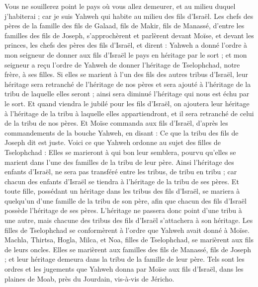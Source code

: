 \begin{multicols}{2}
Vous ne souillerez point le pays où vous allez demeurer, et au milieu duquel j'habiterai ; car je suis Yahweh qui habite au milieu des fils d'Israël.
\VerseOne{}Les chefs des pères de la famille des fils de Galaad, fils de Makir, fils de Manassé, d'entre les familles des fils de Joseph, s'approchèrent et parlèrent devant Moïse, et devant les princes, les chefs des pères des fils d'Israël,
et dirent : Yahweh a donné l’ordre à mon seigneur de donner aux fils d'Israël le pays en héritage par le sort ; et mon seigneur a reçu l'ordre de Yahweh de donner l'héritage de Tselophchad, notre frère, à ses filles.
Si elles se marient à l'un des fils des autres tribus d'Israël, leur héritage sera retranché de l'héritage de nos pères et sera ajouté à l’héritage de la tribu de laquelle elles seront ; ainsi sera diminué l'héritage qui nous est échu par le sort.
Et quand viendra le jubilé pour les fils d'Israël, on ajoutera leur héritage à l'héritage de la tribu à laquelle elles appartiendront, et il sera retranché de celui de la tribu de nos pères.
Et Moïse commanda aux fils d'Israël, d’après les commandements de la bouche Yahweh, en disant : Ce que la tribu des fils de Joseph dit est juste.
Voici ce que Yahweh ordonne au sujet des filles de Tselophchad : Elles se marieront à qui bon leur semblera, pourvu qu’elles se marient dans l'une des familles de la tribu de leur père.
Ainsi l’héritage des enfants d’Israël, ne sera pas transféré entre les tribus, de tribu en tribu ; car chacun des enfants d’Israël se tiendra à l’héritage de la tribu de ses pères.
Et toute fille, possédant un héritage dans les tribus des fils d'Israël, se mariera à quelqu'un d’une famille de la tribu de son père, afin que chacun des fils d'Israël possède l'héritage de ses pères.
L'héritage ne passera donc point d'une tribu à une autre, mais chacune des tribus des fils d'Israël s’attachera à son héritage.
Les filles de Tselophchad se conformèrent à l’ordre que Yahweh avait donné à Moïse.
Machla, Thirtsa, Hogla, Milca, et Noa, filles de Tselophchad, se marièrent aux fils de leurs oncles.
Elles se marièrent aux familles des fils de Manassé, fils de Joseph ; et leur héritage demeura dans la tribu de la famille de leur père.
Tels sont les ordres et les jugements que Yahweh donna par Moïse aux fils d'Israël, dans les plaines de Moab, près du Jourdain, vis-à-vis de Jéricho.
\PPE{}
\end{multicols}
